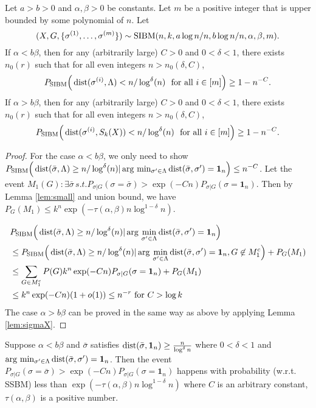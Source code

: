 \documentclass{article}
\begin{document}
\begin{proposition} \label{prop:1}
Let $a>b>0$ and $\alpha,\beta>0$ be constants. Let $m$ be a positive integer that is upper bounded by some polynomial of $n$.
Let 
$$
(X,G,\{\sigma^{(1)},\dots,\sigma^{(m)}\})\sim \operatorname{SIBM}(n,k, a\log n/n, b\log n/n, \alpha,\beta, m) .
$$
If $\alpha < b\beta$, then for any (arbitrarily large) $C>0$ and $0<\delta<1$, there exists $n_0(r)$ such that for all even integers $n>n_0(\delta, C)$,
$$
P_{\operatorname{SIBM}} \Big(\operatorname{dist}(\sigma^{(i)}, \Lambda)< n/\log^{\delta}(n)
\text{~~for all~} i\in[m] \Big) \ge 1- n^{-C} .
$$
If $\alpha > b\beta$, then for any (arbitrarily large) $C>0$ and $0<\delta<1$, there exists $n_0(r)$ such that for all even integers $n>n_0(\delta, C)$,
$$
P_{\operatorname{SIBM}} \Big(\operatorname{dist}(\sigma^{(i)}, S_k(X)) < n/\log^{\delta}(n)
\text{~~for all~} i\in[m] \Big) \ge 1- n^{-C} .
$$
\end{proposition}
\begin{proof}
For the case $\alpha < b \beta$, we only need to show $P_{\operatorname{SIBM}} \Big(\operatorname{dist}(\bar{\sigma}, \Lambda)\geq n/\log^{\delta}(n)
| \arg\,\min_{\sigma'\in \Lambda} \operatorname{dist}(\bar{\sigma}, \sigma') = \mathbf{1}_n
 \Big) \leq n^{-C}$.
 Let the event $M_1(G): \exists \bar{\sigma} \,s.t. P_{\sigma | G}(\sigma = \bar{\sigma} ) > \exp(-Cn) P_{\sigma | G}(\sigma = \mathbf{1}_n)$.
Then by Lemma \ref{lem:small} and union bound, we have $P_{G}(M_1) \leq k^n\exp(-\tau(\alpha, \beta )n \log^{1-\delta} n )$.
 
\begin{align*}
&P_{\operatorname{SIBM}} \Big(\operatorname{dist}(\bar{\sigma}, \Lambda)\geq n/\log^{\delta}(n)
| \arg\,\min_{\sigma'\in \Lambda} \operatorname{dist}(\bar{\sigma}, \sigma') = \mathbf{1}_n \Big) \\
&\leq
P_{\operatorname{SIBM}} \Big(\operatorname{dist}(\bar{\sigma}, \Lambda)\geq n/\log^{\delta}(n)
| \arg\,\min_{\sigma'\in \Lambda} \operatorname{dist}(\bar{\sigma}, \sigma')= \mathbf{1}_n, G \not\in M_1^c\Big) + P_G(M_1) \\
&\leq \sum_{G \in M_1^c} P(G) k^n\exp(-Cn)P_{\sigma|G}(\sigma=\mathbf{1}_n) + P_G(M_1) \\
& \leq k^n \exp(-Cn) (1 + o(1)) \leq n^{-r} \textrm{ for } C> \log k
\end{align*}
The case $\alpha > b \beta$ can be proved in the same way as above by applying Lemma \ref{lem:sigmaX}.
\end{proof}
\begin{lemma}\label{lem:small}
	Suppose $\alpha< b \beta$ and $\bar{\sigma}$ satisfies $\operatorname{dist}(\bar{\sigma}, \mathbf{1}_n) \geq \frac{n}{\log^{\delta} n}$
	where $0<\delta < 1$ and $\arg\,\min_{\sigma'\in \Lambda} \operatorname{dist}(\bar{\sigma}, \sigma') = \mathbf{1}_n$. Then the event
	$P_{\sigma | G}(\sigma = \bar{\sigma} ) > \exp(-Cn) P_{\sigma | G}(\sigma = \mathbf{1}_n)$
	happens with probability (w.r.t. SSBM) less than $\exp(-\tau(\alpha,\beta) n \log^{1-\delta} n )$ where $C$ is an arbitrary constant, $\tau(\alpha,\beta)$ is a positive number.
\end{lemma}
\end{document}
